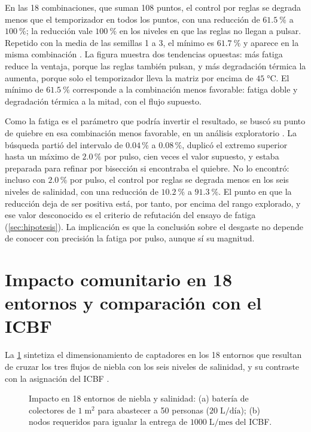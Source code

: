 En las 18 combinaciones, que suman 108 puntos, el control por reglas se degrada menos que el temporizador en todos los puntos, con una reducci\'on de $\SI{61.5}{\percent}$ a $\SI{100}{\percent}$; la reducci\'on vale $\SI{100}{\percent}$ en los niveles en que las reglas no llegan a pulsar. Repetido con la media de las semillas 1 a 3, el m\'inimo es $\SI{61.7}{\percent}$ y aparece en la misma combinaci\'on \parencite[doc.~04, \S~8.11]{axioma2026engine}. La figura muestra dos tendencias opuestas: m\'as fatiga reduce la ventaja, porque las reglas tambi\'en pulsan, y m\'as degradaci\'on t\'ermica la aumenta, porque solo el temporizador lleva la matriz por encima de $45\;\si{\celsius}$. El m\'inimo de $\SI{61.5}{\percent}$ corresponde a la combinaci\'on menos favorable: fatiga doble y degradaci\'on t\'ermica a la mitad, con el flujo supuesto.

Como la fatiga es el par\'ametro que podr\'ia invertir el resultado, se busc\'o su punto de quiebre en esa combinaci\'on menos favorable, en un an\'alisis exploratorio \parencite[doc.~04, \S~8.11]{axioma2026engine}. La b\'usqueda parti\'o del intervalo de $0.04\,\%$ a $0.08\,\%$, duplic\'o el extremo superior hasta un m\'aximo de $2.0\,\%$ por pulso, cien veces el valor supuesto, y estaba preparada para refinar por bisecci\'on si encontraba el quiebre. No lo encontr\'o: incluso con $2.0\,\%$ por pulso, el control por reglas se degrada menos en los seis niveles de salinidad, con una reducci\'on de $\SI{10.2}{\percent}$ a $\SI{91.3}{\percent}$. El punto en que la reducci\'on deja de ser positiva est\'a, por tanto, por encima del rango explorado, y ese valor desconocido es el criterio de refutaci\'on del ensayo de fatiga (\cref{sec:hipotesis}). La implicaci\'on es que la conclusi\'on sobre el desgaste no depende de conocer con precisi\'on la fatiga por pulso, aunque s\'i su magnitud.

\section{Impacto comunitario en 18 entornos y comparaci\'on con el ICBF}
\label{sec:impacto}
La \cref{fig:impacto_entornos} sintetiza el dimensionamiento de captadores en los 18 entornos que resultan de cruzar los tres flujos de niebla con los seis niveles de salinidad, y su contraste con la asignaci\'on del ICBF \parencite{icbf2025agua}.

\begin{figure}[htbp]
\centering

\caption{Impacto en 18 entornos de niebla y salinidad: (a) bater\'ia de colectores de $1\;\text{m}^2$ para abastecer a 50 personas ($20\;\text{L/d\'ia}$); (b) nodos requeridos para igualar la entrega de $1000\;\text{L/mes}$ del ICBF.}
\label{fig:impacto_entornos}
\end{figure}

